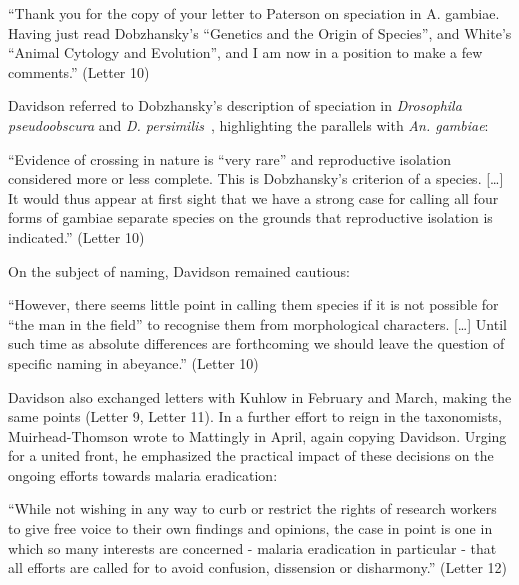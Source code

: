 \documentclass[a4paper,11pt,abstracton,hidelinks]{scrartcl}
\begin{document}
\begin{displayquote}
``Thank you for the copy of your letter to Paterson on speciation in A. gambiae. Having just read Dobzhansky's ``Genetics and the Origin of Species'', and White's ``Animal Cytology and Evolution'', and I am now in a position to make a few comments.'' (Letter 10)
\end{displayquote}

Davidson referred to Dobzhansky's description of speciation in \textit{Drosophila pseudoobscura} and \textit{D. persimilis}~\parencite{Dobzhansky1951}, highlighting the parallels with \textit{An. gambiae}:


\begin{displayquote}
``Evidence of crossing in nature is ``very rare'' and reproductive isolation considered more or less complete. This is Dobzhansky's criterion of a species. [\ldots] It would thus appear at first sight that we have a strong case for calling all four forms of gambiae separate species on the grounds that reproductive isolation is indicated.'' (Letter 10)
\end{displayquote}


On the subject of naming, Davidson remained cautious:


\begin{displayquote}
``However, there seems little point in calling them species if it is not possible for ``the man in the field'' to recognise them from morphological characters. [\ldots] Until such time as absolute differences are forthcoming we should leave the question of specific naming in abeyance.'' (Letter 10)
\end{displayquote}


Davidson also exchanged letters with Kuhlow in February and March, making the same points (Letter 9, Letter 11).
%
In a further effort to reign in the taxonomists, Muirhead-Thomson wrote to Mattingly in April, again copying Davidson.
%
Urging for a united front, he emphasized the practical impact of these decisions on the ongoing efforts towards malaria eradication:


\begin{displayquote}
``While not wishing in any way to curb or restrict the rights of research workers to give free voice to their own findings and opinions, the case in point is one in which so many interests are concerned - malaria eradication in particular - that all efforts are called for to avoid confusion, dissension or disharmony.'' (Letter 12)
\end{displayquote}
\end{document}
